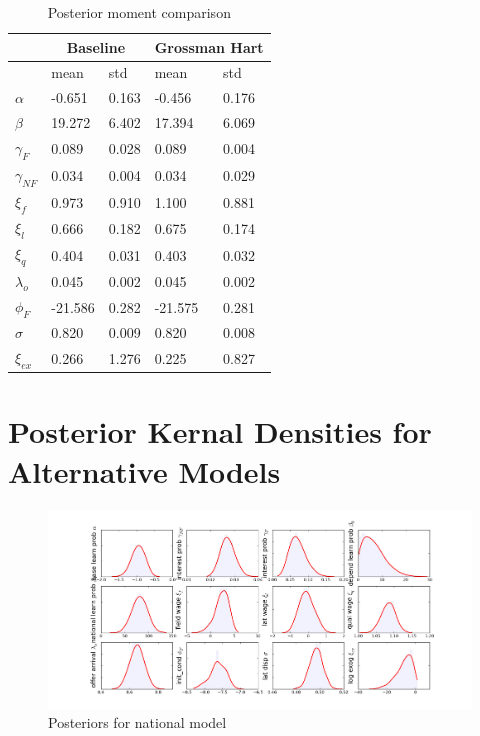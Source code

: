\begin{table}[h!]
    \centering
    \begin{tabular}{|l|l|l|l|l|}
        \hline
         & \multicolumn{2}{|c|}{Baseline}        & \multicolumn{2}{|c|}{Grossman Hart} \\ \hline\hline
                            & mean    & std   & mean       & std    \\ \hline
         $\alpha$           & -0.651  & 0.163 & -0.456     & 0.176  \\ \hline
         $\beta$            & 19.272  & 6.402 & 17.394     & 6.069  \\ \hline
         $\gamma_{F}$       & 0.089   & 0.028 & 0.089      & 0.004  \\ \hline
         $\gamma_{NF}$      & 0.034   & 0.004 & 0.034      & 0.029  \\ \hline
         $\xi_f$            & 0.973   & 0.910 & 1.100      & 0.881  \\ \hline
         $\xi_l$            & 0.666   & 0.182 & 0.675      & 0.174  \\ \hline
         $\xi_q$            & 0.404   & 0.031 & 0.403      & 0.032  \\ \hline
         $\lambda_o$        & 0.045   & 0.002 & 0.045      & 0.002  \\ \hline
         $\phi_F$           & -21.586 & 0.282 & -21.575    & 0.281  \\ \hline
         $\sigma$           & 0.820   & 0.009 & 0.820      & 0.008  \\ \hline
         $\xi_{ex}$         & 0.266   & 1.276 & 0.225      & 0.827  \\ \hline
    \end{tabular}
    \caption{Posterior moment comparison}
    \label{tab:post_comp}
\end{table}

\section{Posterior Kernal Densities for Alternative Models}
\label{sec:altmodels}

\begin{figure}[h!]
    \includegraphics{pics/params_dists_reg.png}
    \caption{Posteriors for national model}
\end{figure}

